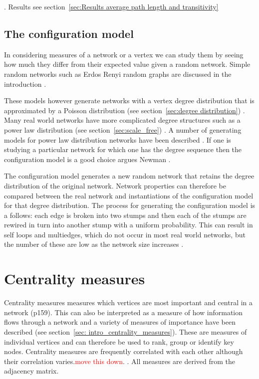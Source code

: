 . Results see section~\ref{sec:Results average path length and transitivity}

\subsection{The configuration model}
\label{sec:configuration model}
In considering measures of  a network or a vertex we can study them by seeing how much they differ from their expected value given a random network. Simple random networks such as Erdos Renyi random graphs are discussed in the introduction .

These models however generate networks with a vertex degree distribution that is approximated by  a Poisson distribution (see section~\ref{sec:degree distribution}) . Many real world networks have more complicated degree structures such as a power law distribution (see section~\ref{sec:scale_free}) . A number of generating models for power law distribution networks have been described . If one is studying a particular network for which one has the degree sequence then the configuration model is a good choice argues Newman . \cite{newman2018networks}

The configuration model generates a new random network that retains the degree distribution of the original network. Network properties can therefore be compared between the real network and instantiations of the configuration model for that degree distribution. The process for generating the configuration model is a follows: each edge is broken into two stumps and then each of the stumps are rewired in turn into another stump with a uniform probability. This can result in self loops and multiedges, which do not occur in most real world networks, but the number of these are low as the network size increases \cite{newman2018networks}.




\section{Centrality measures}
\label{sec:centrality measures}
Centrality measures measures which vertices are most important and central in a network \cite{newman2018networks}(p159). This can also be interpreted as a measure of how information flows through a network \cite{borgatti2005centrality} and a variety of measures of importance have been described (see section~\ref{sec: intro_centrality_measures}). These are measures of individual vertices and can therefore be used to rank, group or identify key nodes. Centrality measures are frequently correlated with each other \cite{valente2008correlated} although their correlation varies.\textcolor{red}{move this down}. . All measures are derived from the adjacency matrix.



